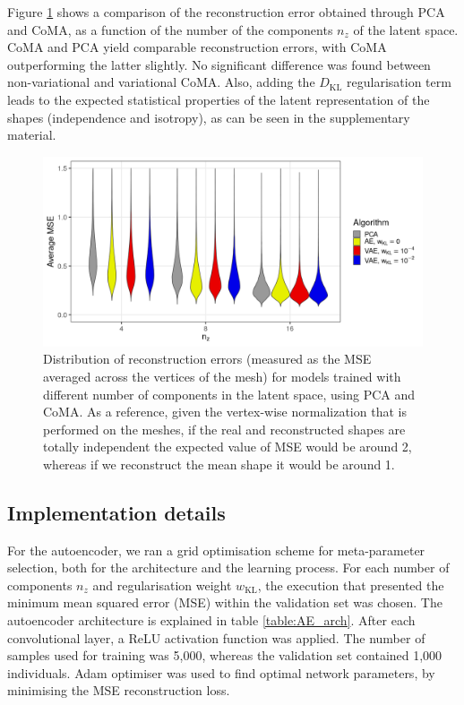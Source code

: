 \documentclass[fleqn,10pt]{wlscirep}
\begin{document}
Figure \ref{fig:pca_vs_coma} shows a comparison of the reconstruction error obtained through PCA and CoMA, as a function of the number of the components $n_z$ of the latent space. CoMA and PCA yield comparable reconstruction errors, with CoMA outperforming the latter slightly. No significant difference was found between non-variational and variational CoMA.
Also, adding the $D_\textrm{KL}$ regularisation term leads to the expected statistical properties of the latent representation of the shapes (independence and isotropy), as can be seen in the supplementary material.

\begin{figure}[ht!]
\includegraphics[width=\linewidth]{figs/performance.png}
\caption{Distribution of reconstruction errors (measured as the MSE averaged across the vertices of the mesh) for models trained with different number of components in the latent space, using PCA and CoMA. As a reference, given the vertex-wise normalization that is performed on the meshes, if the real and reconstructed shapes are totally independent the expected value of MSE would be around 2, whereas if we reconstruct the mean shape it would be around 1.}
\label{fig:pca_vs_coma}
\end{figure}

\subsection{Implementation details}
For the autoencoder, we ran a grid optimisation scheme for meta-parameter selection, both for the architecture and the learning process. For each number of components $n_z$ and regularisation weight $w_\textrm{KL}$, the execution that presented the minimum mean squared error (MSE) within the validation set was chosen.
The autoencoder architecture is explained in table \ref{table:AE_arch}. After each convolutional layer, a ReLU activation function was applied. The number of samples used for training was 5,000, whereas the validation set contained 1,000 individuals. Adam optimiser was used to find optimal network parameters, by minimising the MSE reconstruction loss.
\end{document}
